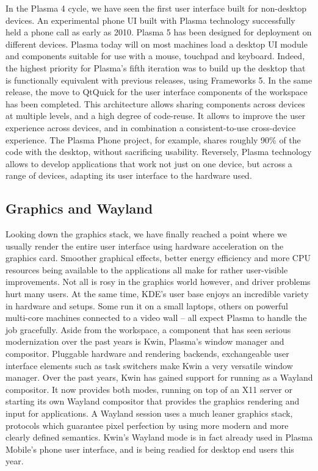 In the Plasma 4 cycle, we have seen the first user interface built for non-desktop devices. An experimental phone UI built with Plasma technology successfully held a phone call as early as 2010. Plasma 5 has been designed for deployment on different devices. Plasma today will on most machines load a desktop UI module and components suitable for use with a mouse, touchpad and keyboard.
Indeed, the highest priority for Plasma's fifth iteration was to build up the desktop that is functionally equivalent with previous releases, using Frameworks 5. In the same release, the move to QtQuick for the user interface components of the workspace has been completed.
This architecture allows sharing components across devices at multiple levels, and a high degree of code-reuse. It allows to improve the user experience across devices, and in combination a consistent-to-use cross-device experience. The Plasma Phone project, for example, shares roughly 90\% of the code with the desktop, without sacrificing usability.
Reversely, Plasma technology allows to develop applications that work not just on one device, but across a range of devices, adapting its user interface to the hardware used.

\subsection*{Graphics and Wayland}

Looking down the graphics stack, we have finally reached a point where we usually render the entire user interface using hardware acceleration on the graphics card. Smoother graphical effects, better energy efficiency and more CPU resources being available to the applications all make for rather user-visible improvements. Not all is rosy in the graphics world however, and driver problems hurt many users. At the same time, KDE's user base enjoys an incredible variety in hardware and setups. Some run it on a small laptops, others on powerful multi-core machines connected to a video wall -- all expect Plasma to handle the job gracefully.
Aside from the workspace, a component that has seen serious modernization over the past years is Kwin, Plasma's window manager and compositor. Pluggable hardware and rendering backends, exchangeable user interface elements such as task switchers make Kwin a very versatile window manager. Over the past years, Kwin has gained support for running as a Wayland compositor. It now provides both modes, running on top of an X11 server or starting its own Wayland compositor that provides the graphics rendering and input for applications. A Wayland session uses a much leaner graphics stack, protocols which guarantee pixel perfection by using more modern and more clearly defined semantics. Kwin's Wayland mode is in fact already used in Plasma Mobile's phone user interface, and is being readied for desktop end users this year.

